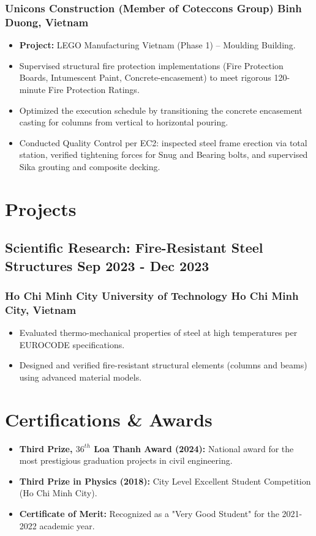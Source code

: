 \documentclass[11pt]{article} %
\begin{document}
\subsubsection{Unicons Construction (Member of Coteccons Group) \hfill Binh Duong, Vietnam} 
\begin{itemize}
    \item \textbf{Project:} LEGO Manufacturing Vietnam (Phase 1) -- Moulding Building.
    \item Supervised structural fire protection implementations (Fire Protection Boards, Intumescent Paint, Concrete-encasement) to meet rigorous 120-minute Fire Protection Ratings. 
    \item Optimized the execution schedule by transitioning the concrete encasement casting for columns from vertical to horizontal pouring. 
    \item Conducted Quality Control per EC2: inspected steel frame erection via total station, verified tightening forces for Snug and Bearing bolts, and supervised Sika grouting and composite decking. 
\end{itemize}

\section{Projects}
\subsection{Scientific Research: Fire-Resistant Steel Structures \hfill Sep 2023 - Dec 2023} 
\subsubsection{Ho Chi Minh City University of Technology \hfill Ho Chi Minh City, Vietnam}
\begin{itemize}
    \item Evaluated thermo-mechanical properties of steel at high temperatures per EUROCODE specifications. 
    \item Designed and verified fire-resistant structural elements (columns and beams) using advanced material models. 
\end{itemize}

\section{Certifications \& Awards}
\begin{itemize}
    \item \textbf{Third Prize, $36^{th}$ Loa Thanh Award (2024):} National award for the most prestigious graduation projects in civil engineering.
    \item \textbf{Third Prize in Physics (2018):} City Level Excellent Student Competition (Ho Chi Minh City).
    \item \textbf{Certificate of Merit:} Recognized as a "Very Good Student" for the 2021-2022 academic year.
\end{itemize}
\end{document}

